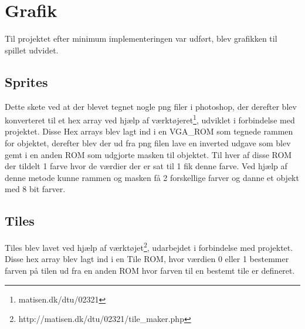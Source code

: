 \section{Grafik}
Til projektet efter minimum implementeringen var udført, blev grafikken til spillet udvidet. 

\subsection{Sprites}
 Dette skete ved at der blevet tegnet nogle png filer i photoshop, der derefter blev konverteret til et hex array ved hjælp af værktøjeret\footnote{matisen.dk/dtu/02321}, udviklet i forbindelse med projektet. Disse Hex arrays blev lagt ind i en VGA\_ROM som tegnede rammen for objektet, derefter blev der ud fra png filen lave en inverted udgave som blev gemt i en anden ROM som udgjorte masken til objektet. Til hver af disse ROM der tildelt 1 farve hvor de værdier der er sat til 1 fik denne farve. Ved hjælp af denne metode kunne rammen og masken få 2 forskellige farver og danne et objekt med 8 bit farver.
 
\subsection{Tiles}
Tiles blev lavet ved hjælp af værktøjet\footnote{http://matisen.dk/dtu/02321/tile\_maker.php}, udarbejdet i forbindelse med projektet. Disse hex array blev lagt ind i en Tile ROM, hvor værdien 0 eller 1 bestemmer farven på tilen ud fra en anden ROM hvor farven til en bestemt tile er defineret.
